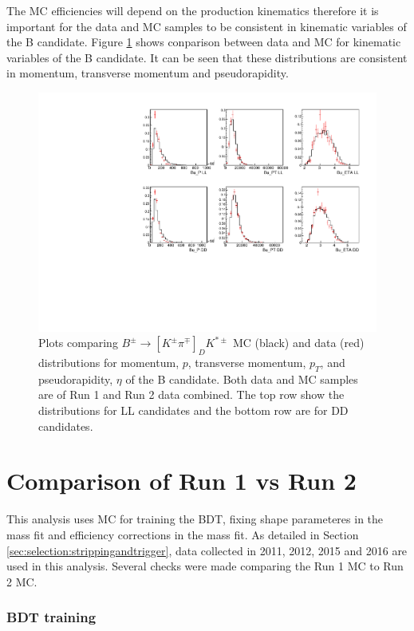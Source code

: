 The MC efficiencies will depend on the production kinematics therefore it is important for the data and MC samples to be consistent in kinematic variables of the B candidate. Figure \ref{bkinematics} shows conparison between data and MC for kinematic variables of the B candidate. It can be seen that these distributions are consistent in momentum, transverse momentum and pseudorapidity.

\begin{figure}
\includegraphics[width=\linewidth]{figures/compareMC/Bkinematics.pdf}
\caption{Plots comparing $B^{\pm} \to [K^{\pm}\pi^{\mp}]_D K^{*\pm}$ MC (black) and data (red) distributions for momentum, $p$, transverse momentum, $p_T$, and pseudorapidity, $\eta$ of the B candidate. Both data and MC samples are of Run 1 and Run 2 data combined. The top row show the distributions for LL candidates and the bottom row are for DD candidates.}
\label{bkinematics}
\end{figure}

\section{Comparison of Run 1 vs Run 2}

This analysis uses MC for training the BDT, fixing shape parameteres in the mass fit and efficiency corrections in the mass fit. As detailed in Section \ref{sec:selection:strippingandtrigger}, data collected in 2011, 2012, 2015 and 2016 are used in this analysis. Several checks were made comparing the Run 1 MC to Run 2 MC.

\subsubsection{BDT training}
\label{sec:mc:bdt}

